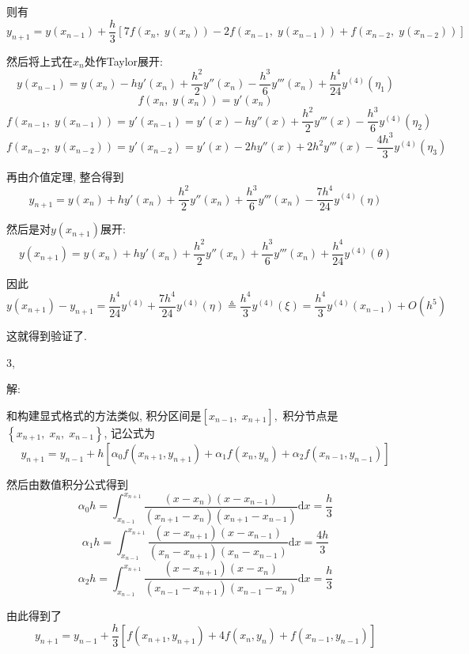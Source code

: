 \documentclass{article}
\providecommand{\xequal}[2][]{\mathop{=}\limits_{#1}^{#2}}
\begin{document}
则有
\[ y_{n + 1} = y (x_{n - 1}) + \frac{h}{3} \left[ 7 f \left( x_n, \; y (x_n)
   \right) - 2 f \left( x_{n - 1}, \; y (x_{n - 1}) \right) + f \left( x_{n -
   2}, \; y (x_{n - 2}) \right) \right] \]


然后将上式在$x_n$处作Taylor展开:
\[ y (x_{n - 1}) = y (x_n) - h y' (x_n) + \frac{h^2}{2} y'' (x_n) -
   \frac{h^3}{6} y''' (x_n) + \frac{h^4}{24} y^{(4)} (\eta_1) \]
\[ \  \]
\[ f \left( x_n, \; y (x_n) \right) = y' (x_n) \]
\[ f \left( x_{n - 1}, \; y (x_{n - 1}) \right) = y' (x_{n - 1}) = y' (x) - h
   y'' (x) + \frac{h^2}{2} y''' (x) - \frac{h^3}{6} y^{(4)} (\eta_2) \]
\[ f \left( x_{n - 2}, \; y (x_{n - 2}) \right) = y' (x_{n - 2}) = y' (x) - 2
   h y'' (x) + 2 h^2 y''' (x) - \frac{4 h^3}{3} y^{(4)} (\eta_3) \]


再由介值定理, 整合得到
\[ y_{n + 1} = y (x_n) + h y' (x_n) + \frac{h^2}{2} y'' (x_n) + \frac{h^3}{6}
   y''' (x_n) - \frac{7 h^4}{24} y^{(4)} (\eta ) \]


然后是对$y (x_{n + 1})$展开:
\[ y (x_{n + 1}) = y (x_n) + h y' (x_n) + \frac{h^2}{2} y'' (x_n) +
   \frac{h^3}{6} y''' (x_n) + \frac{h^4}{24} y^{(4)} (\theta) \]


因此
\[ y (x_{n + 1}) - y_{n + 1} = \frac{h^4}{24} y^{(4)} + \frac{7 h^4}{24}
   y^{(4)} (\eta ) \xequal{\vartriangle} \frac{h^4}{3} y^{(4)} (\xi) =
   \frac{h^4}{3} y^{(4)} (x_{n - 1}) + O (h^5) \]


这就得到验证了.

3,

解:

和构建显式格式的方法类似, 积分区间是$\left[ x_{n - 1}, \;
x_{n + 1} \right],$ 积分节点是$\left\{ x_{n + 1}, \; x_n, \; x_{n - 1}
\right\}$, 记公式为
\[ y_{n + 1} = y_{n - 1} + h [\alpha_0 f (x_{n + 1}, y_{n + 1}) + \alpha_1 f
   (x_n, y_n) + \alpha_2 f (x_{n - 1}, y_{n - 1})] \]


然后由数值积分公式得到
\[ \alpha_0 h = \int_{x_{n - 1}}^{x_{n + 1}} \frac{(x - x_n) (x - x_{n -
   1})}{(x_{n + 1} - x_n) (x_{n + 1} - x_{n - 1})} \mathrm{d} x = \frac{h}{3}
\]
\[ \alpha_1 h = \int_{x_{n - 1}}^{x_{n + 1}} \frac{(x - x_{n + 1}) (x - x_{n -
   1})}{(x_n - x_{n + 1}) (x_n - x_{n - 1})} \mathrm{d} x = \frac{4 h}{3} \]
\[ \alpha_2 h = \int_{x_{n - 1}}^{x_{n + 1}} \frac{(x - x_{n + 1}) (x -
   x_n)}{(x_{n - 1} - x_{n + 1}) (x_{n - 1} - x_n)} \mathrm{d} x = \frac{h}{3}
\]


由此得到了
\[ y_{n + 1} = y_{n - 1} + \frac{h}{3} [f (x_{n + 1}, y_{n + 1}) + 4 f (x_n,
   y_n) + f (x_{n - 1}, y_{n - 1})] \]
\end{document}
